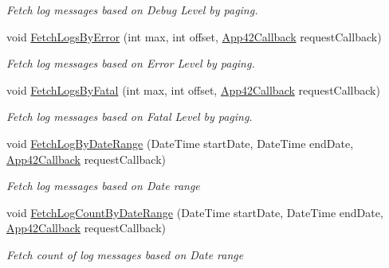 \begin{DoxyCompactItemize}
\begin{DoxyCompactList}\small\item\em Fetch log messages based on Debug Level by paging. \end{DoxyCompactList}\item 
void \hyperlink{classcom_1_1shephertz_1_1app42_1_1paas_1_1sdk_1_1windows_1_1log_1_1_log_service_af28ba96cb41c7d461dbd4836ed2c399d}{Fetch\+Logs\+By\+Error} (int max, int offset, \hyperlink{interfacecom_1_1shephertz_1_1app42_1_1paas_1_1sdk_1_1windows_1_1_app42_callback}{App42\+Callback} request\+Callback)
\begin{DoxyCompactList}\small\item\em Fetch log messages based on Error Level by paging. \end{DoxyCompactList}\item 
void \hyperlink{classcom_1_1shephertz_1_1app42_1_1paas_1_1sdk_1_1windows_1_1log_1_1_log_service_a55f9aa29d64de6de598c747343e8a36b}{Fetch\+Logs\+By\+Fatal} (int max, int offset, \hyperlink{interfacecom_1_1shephertz_1_1app42_1_1paas_1_1sdk_1_1windows_1_1_app42_callback}{App42\+Callback} request\+Callback)
\begin{DoxyCompactList}\small\item\em Fetch log messages based on Fatal Level by paging. \end{DoxyCompactList}\item 
void \hyperlink{classcom_1_1shephertz_1_1app42_1_1paas_1_1sdk_1_1windows_1_1log_1_1_log_service_a3724994ecbaf4832103a7cf7b55ff82b}{Fetch\+Log\+By\+Date\+Range} (Date\+Time start\+Date, Date\+Time end\+Date, \hyperlink{interfacecom_1_1shephertz_1_1app42_1_1paas_1_1sdk_1_1windows_1_1_app42_callback}{App42\+Callback} request\+Callback)
\begin{DoxyCompactList}\small\item\em Fetch log messages based on Date range \end{DoxyCompactList}\item 
void \hyperlink{classcom_1_1shephertz_1_1app42_1_1paas_1_1sdk_1_1windows_1_1log_1_1_log_service_a8b19a24b4d22b29c12daa70ac6de1ab3}{Fetch\+Log\+Count\+By\+Date\+Range} (Date\+Time start\+Date, Date\+Time end\+Date, \hyperlink{interfacecom_1_1shephertz_1_1app42_1_1paas_1_1sdk_1_1windows_1_1_app42_callback}{App42\+Callback} request\+Callback)
\begin{DoxyCompactList}\small\item\em Fetch count of log messages based on Date range \end{DoxyCompactList}\item 

\end{DoxyCompactItemize}
